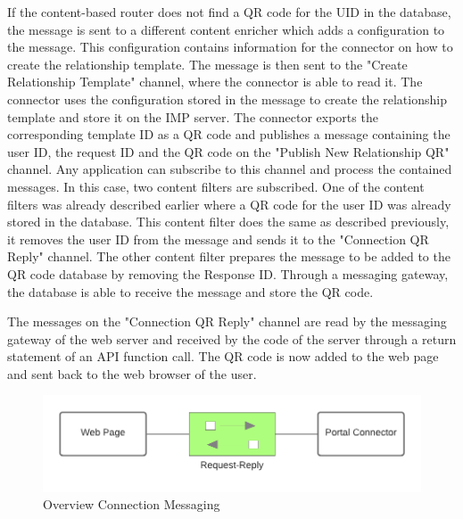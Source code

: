 \documentclass[
     12pt,         %
     a4paper,      %
     BCOR=10mm,version=first,     %
     DIV=14,version=first,        %
     ]{scrreprt}
\begin{document}
If the content-based router does not find a QR code for the UID in the database, the message is sent to a different content enricher which adds a configuration to the message. This configuration contains information for the connector on how to create the relationship template. The message is then sent to the "Create Relationship Template" channel, where the connector is able to read it. The connector uses the configuration stored in the message to create the relationship template and store it on the IMP server. The connector exports the corresponding template ID as a QR code and publishes a message containing the user ID, the request ID and the QR code on the "Publish New Relationship QR" channel. Any application can subscribe to this channel and process the contained messages. In this case, two content filters are subscribed. One of the content filters was already described earlier where a QR code for the user ID was already stored in the database. This content filter does the same as described previously, it removes the user ID from the message and sends it to the "Connection QR Reply" channel.
The other content filter prepares the message to be added to the QR code database by removing the Response ID. Through a messaging gateway, the database is able to receive the message and store the QR code.

The messages on the "Connection QR Reply" channel are read by the messaging gateway of the web server and received by the code of the server through a return statement of an API function call. The QR code is now added to the web page and sent back to the web browser of the user.

































\begin{figure}[h]
\caption{Overview Connection Messaging}
    \centering
    \includegraphics[scale=0.3]{Diagrams/Integration 1/Connection/Messaging Overview.png}
\end{figure}
\end{document}
